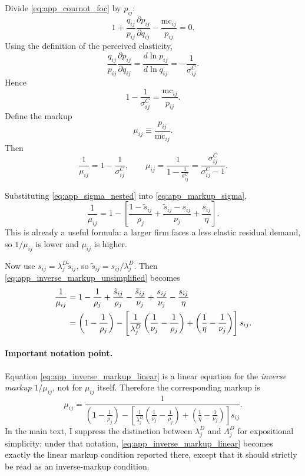 Divide \eqref{eq:app_cournot_foc} by $p_{ij}$:
\[
1
+ \frac{q_{ij}}{p_{ij}} \frac{\partial p_{ij}}{\partial q_{ij}}
- \frac{\text{mc}_{ij}}{p_{ij}}
=
0.
\]
Using the definition of the perceived elasticity,
\[
\frac{q_{ij}}{p_{ij}} \frac{\partial p_{ij}}{\partial q_{ij}}
=
\frac{d \ln p_{ij}}{d \ln q_{ij}}
=
- \frac{1}{\sigma_{ij}^C}.
\]
Hence
\[
1 - \frac{1}{\sigma_{ij}^C} = \frac{\text{mc}_{ij}}{p_{ij}}.
\]
Define the markup
\[
\mu_{ij} \equiv \frac{p_{ij}}{\text{mc}_{ij}}.
\]
Then
\begin{equation}
\frac{1}{\mu_{ij}}
=
1 - \frac{1}{\sigma_{ij}^C},
\qquad
\mu_{ij}
=
\frac{1}{1-\frac{1}{\sigma_{ij}^C}}
=
\frac{\sigma_{ij}^C}{\sigma_{ij}^C-1}.
\label{eq:app_markup_sigma}
\end{equation}

Substituting \eqref{eq:app_sigma_nested} into \eqref{eq:app_markup_sigma},
\begin{equation}
\frac{1}{\mu_{ij}}
=
1
-
\left[
\frac{1-\tilde{s}_{ij}}{\rho_j}
+
\frac{\tilde{s}_{ij} - s_{ij}}{\nu_j}
+
\frac{s_{ij}}{\eta}
\right].
\label{eq:app_inverse_markup_unsimplified}
\end{equation}
This is already a useful formula: a larger firm faces a less elastic residual demand, so $1/\mu_{ij}$ is lower and $\mu_{ij}$ is higher.

Now use $s_{ij} = \lambda_j^D \tilde{s}_{ij}$, so $\tilde{s}_{ij} = s_{ij}/\lambda_j^D$. Then \eqref{eq:app_inverse_markup_unsimplified} becomes
\begin{align}
\frac{1}{\mu_{ij}}
&=
1 - \frac{1}{\rho_j}
+ \frac{\tilde{s}_{ij}}{\rho_j}
- \frac{\tilde{s}_{ij}}{\nu_j}
+ \frac{s_{ij}}{\nu_j}
- \frac{s_{ij}}{\eta}
\notag \\
&=
\left( 1 - \frac{1}{\rho_j} \right)
-
\left[
\frac{1}{\lambda_j^D}
\left( \frac{1}{\nu_j} - \frac{1}{\rho_j} \right)
+
\left( \frac{1}{\eta} - \frac{1}{\nu_j} \right)
\right] s_{ij}.
\label{eq:app_inverse_markup_linear}
\end{align}

\paragraph{Important notation point.}
Equation \eqref{eq:app_inverse_markup_linear} is a linear equation for the \emph{inverse markup} $1/\mu_{ij}$, not for $\mu_{ij}$ itself. Therefore the corresponding markup is
\begin{equation}
\mu_{ij}
=
\frac{1}{
\left( 1 - \frac{1}{\rho_j} \right)
-
\left[
\frac{1}{\lambda_j^D}
\left( \frac{1}{\nu_j} - \frac{1}{\rho_j} \right)
+
\left( \frac{1}{\eta} - \frac{1}{\nu_j} \right)
\right] s_{ij}
}.
\label{eq:app_markup_full}
\end{equation}
In the main text, I suppress the distinction between $\lambda_j^D$ and $\Lambda_j^D$ for expositional simplicity; under that notation, \eqref{eq:app_inverse_markup_linear} becomes exactly the linear markup condition reported there, except that it should strictly be read as an inverse-markup condition.

